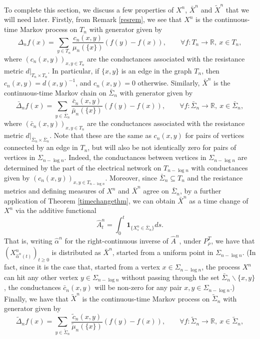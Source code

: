 \documentclass[a4paper, 11pt]{article}
\begin{document}
To complete this section, we discuss a few properties of $X^n$, $\bar X^{n}$ and $\tilde X^{n}$ that we will need later. Firstly, from Remark \ref{resrem}, we see that $X^n$ is the continuous-time Markov process on $T_n$ with generator given by
\[\Delta_nf(x)=\sum_{y\in T_n}\frac{c_n(x,y)}{\mu_n(\{x\})}\left(f(y)-f(x)\right),\qquad \forall f:T_n\rightarrow \mathbb{R},\:x\in  T_n,\]
where $(c_n(x,y))_{x,y\in T_n}$ are the conductances associated with the resistance metric $d|_{T_n\times T_n}$. In particular, if $\{x,y\}$ is an edge in the graph $T_n$, then $c_n(x,y)=d(x,y)^{-1}$, and $c_n(x,y)=0$ otherwise. Similarly, $\bar X^{n}$ is the continuous-time Markov chain on $\bar{\Sigma}_n$ with generator given by
\[\bar{\Delta}_nf(x)=\sum_{y\in \bar{\Sigma}_n}\frac{\bar{c}_n(x,y)}{\bar{\mu}_n(\{x\})}\left(f(y)-f(x)\right),\qquad \forall f:\bar{\Sigma}_n\rightarrow \mathbb{R},\:x\in  \bar{\Sigma}_n,\]
where $(\bar{c}_n(x,y))_{x,y\in T_n}$ are the conductances associated with the resistance metric $d|_{\bar{\Sigma}_n\times \bar{\Sigma}_n}$. Note that these are the same as ${c}_n(x,y)$ for pairs of vertices connected by an edge in $T_n$, but will also be not identically zero for pairs of vertices in $\Sigma_{n-\log n}$. Indeed, the conductances between vertices in $\Sigma_{n-\log n}$ are determined by the part of the electrical network on $T_{n-\log n}$ with conductances given by $(c_n(x,y))_{x,y\in T_{n-\log n}}$. Moreover, since $\bar{\Sigma}_n\subseteq T_n$ and the resistance metrics and defining measures of $X^n$ and $\bar X^{n}$ agree on $\bar{\Sigma}_n$, by a further application of Theorem \ref{timechangethm}, we can obtain $\bar X^{n}$ as a time change of $X^{n}$ via the additive functional
\begin{equation}\label{hatadef}
\hat{A}^n_t=\int_0^t\mathbf{1}_{\{X^n_s\in\bar{\Sigma}_n\}}ds.
\end{equation}
That is, writing $\hat\alpha^n$ for the right-continuous inverse of $\hat{A}^n$, under $P^T_{\rho}$, we have that $(X^{n}_{\hat\alpha^n(t)})_{t\geq 0}$ is distributed as $\bar{X}^n$, started from a uniform point in $\Sigma_{n-\log n}$. (In fact, since it is the case that, started from a vertex $x\in \Sigma_{n-\log n}$, the process $X^n$ can hit any other vertex $y\in \Sigma_{n-\log n}$ without passing through the set $\bar{\Sigma}_n\backslash \{x,y\}$, the conductances $\bar{c}_n(x,y)$ will be non-zero for any pair $x,y\in \Sigma_{n-\log n}$.) Finally, we have that $\tilde{X}^n$ is the continuous-time Markov process on $\tilde{\Sigma}_n$ with generator given by
\[\tilde{\Delta}_nf(x)=\sum_{y\in \tilde{\Sigma}_n}\frac{\tilde{c}_n(x,y)}{\tilde{\mu}_n(\{x\})}\left(f(y)-f(x)\right),\qquad \forall f:\tilde{\Sigma}_n\rightarrow\mathbb{R},\:x\in  \tilde{\Sigma}_n,\]
\end{document}
